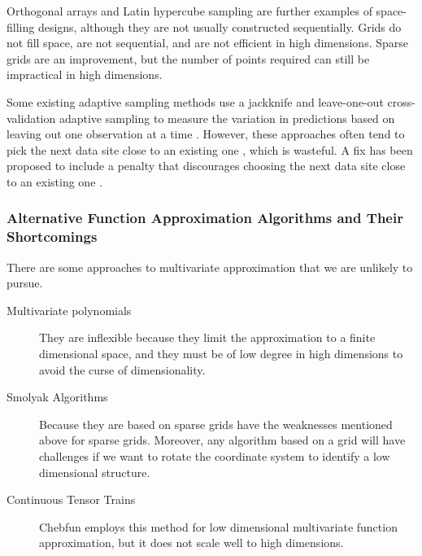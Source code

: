 \documentclass[11pt]{NSFamsart}
\begin{document}
Orthogonal arrays and Latin hypercube sampling are further examples of space-filling designs, although they are not usually constructed sequentially. Grids do not fill space, are not sequential, and are not efficient in high dimensions.  Sparse grids \cite{BunGrie04a} are an improvement, but the number of points required can still be impractical in high dimensions.  

Some existing adaptive sampling methods use a jackknife and leave-one-out cross-validation adaptive sampling to measure the variation in predictions based on leaving out one observation at a time \cite{aute2013cross,jin2002sequential, kleijnen2004application}. However, these approaches often tend to pick the next data site close to an existing one \cite{jin2002sequential}, which is wasteful. A fix has been proposed to include a penalty that discourages choosing the next data site close to an existing one \cite{aute2013cross,jin2002sequential}.

\subsubsection{Alternative Function Approximation Algorithms and Their Shortcomings} \label{sec:shortAlgo}

There are some approaches to multivariate approximation that we are unlikely to pursue.  
\begin{description}
	\item[Multivariate polynomials] They are inflexible because they limit the approximation to a finite dimensional space, and they must be of low degree in high dimensions to avoid the curse of dimensionality.
	\item[Smolyak Algorithms \cite{BunGrie04a}] Because they are based on sparse grids have the weaknesses mentioned above for sparse grids.  Moreover, any algorithm based on a grid will have challenges if we want to rotate the coordinate system to identify a low dimensional structure.
	\item[Continuous Tensor Trains \cite{GorKarMar19a}] Chebfun \cite{DriHalTre14a} employs this method for low dimensional multivariate function approximation, but it does not scale well to high dimensions.
\end{description}


\end{document}
